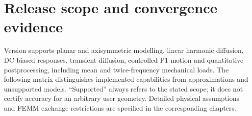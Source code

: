 \section{Release scope and convergence evidence}
\label{sec:status}
Version \luafemmversion{} supports planar and axisymmetric modelling, linear
harmonic diffusion, DC-biased responses, transient diffusion, controlled P1 motion and quantitative
postprocessing, including mean and twice-frequency mechanical loads. The following matrix distinguishes implemented capabilities from
approximations and unsupported models. ``Supported'' always refers to the stated
scope; it does not certify accuracy for an arbitrary user geometry.
Detailed physical assumptions and FEMM exchange restrictions are specified in
the corresponding chapters.

